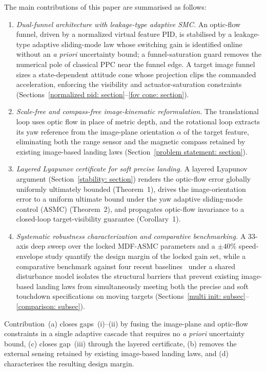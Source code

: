 \documentclass{IEEEtaes}
\begin{document}
The main contributions of this paper are summarised as follows:
\begin{enumerate}
    \item[(a)] \textit{Dual-funnel architecture with leakage-type adaptive SMC.} An optic-flow funnel, driven by a normalized virtual feature PID, is stabilised by a leakage-type adaptive sliding-mode law whose switching gain is identified online without an \emph{a priori} uncertainty bound; a funnel-saturation guard removes the numerical pole of classical PPC near the funnel edge. A target image funnel sizes a state-dependent attitude cone whose projection clips the commanded acceleration, enforcing the visibility and actuator-saturation constraints (Sections~\ref{normalized pid: section}--\ref{fov cone: section}).
    \item[(b)] \textit{Scale-free and compass-free image-kinematic reformulation.} The translational loop uses optic flow in place of metric depth, and the rotational loop extracts its yaw reference from the image-plane orientation $\alpha$ of the target feature, eliminating both the range sensor and the magnetic compass retained by existing image-based landing laws (Section~\ref{problem statement: section}).
    \item[(c)] \textit{Layered Lyapunov certificate for soft precise landing.} A layered Lyapunov argument (Section~\ref{stability: section}) renders the optic-flow error globally uniformly ultimately bounded (Theorem~1), drives the image-orientation error to a uniform ultimate bound under the yaw adaptive sliding-mode control (ASMC) (Theorem~2), and propagates optic-flow invariance to a closed-loop target-visibility guarantee (Corollary~1).
    \item[(d)] \textit{Systematic robustness characterization and comparative benchmarking.} A 33-axis deep sweep over the locked MDF-ASMC parameters and a $\pm 40\%$ speed-envelope study quantify the design margin of the locked gain set, while a comparative benchmark against four recent baselines~\cite{lin2022,zhang2026,chen2025,cho2022} under a shared disturbance model isolates the structural barriers that prevent existing image-based landing laws from simultaneously meeting both the precise and soft touchdown specifications on moving targets (Sections~\ref{multi init: subsec}--\ref{comparison: subsec}).
\end{enumerate}
Contribution~(a) closes gaps~(i)--(ii) by fusing the image-plane and optic-flow constraints in a single adaptive cascade that requires no \emph{a priori} uncertainty bound, (c) closes gap~(iii) through the layered certificate, (b) removes the external sensing retained by existing image-based landing laws, and (d) characterises the resulting design margin.
\end{document}
